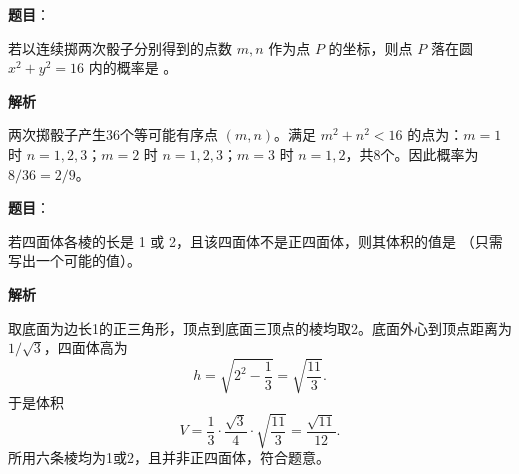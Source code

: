 \begin{answer}

\textbf{题目}：

若以连续掷两次骰子分别得到的点数 $m,n$ 作为点 $P$ 的坐标，则点 $P$ 落在圆 $x^2+y^2=16$ 内的概率是 \gkblank{}。

\textbf{解析}

两次掷骰子产生36个等可能有序点 $(m,n)$。满足 $m^2+n^2<16$ 的点为：$m=1$ 时 $n=1,2,3$；$m=2$ 时 $n=1,2,3$；$m=3$ 时 $n=1,2$，共8个。因此概率为 $8/36=2/9$。


\end{answer}
\begin{answer}

\textbf{题目}：

若四面体各棱的长是 1 或 2，且该四面体不是正四面体，则其体积的值是 \gkblank{}（只需写出一个可能的值）。

\textbf{解析}

取底面为边长1的正三角形，顶点到底面三顶点的棱均取2。底面外心到顶点距离为 $1/\sqrt3$，四面体高为
\nopagebreak[4]
\[
h=\sqrt{2^2-\frac13}=\sqrt{\frac{11}{3}}.
\]
于是体积
\nopagebreak[4]
\[
V=\frac13\cdot\frac{\sqrt3}{4}\cdot\sqrt{\frac{11}{3}}=\frac{\sqrt{11}}{12}.
\]
所用六条棱均为1或2，且并非正四面体，符合题意。


\end{answer}

